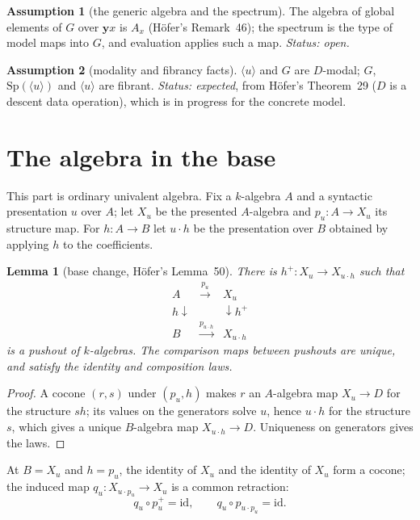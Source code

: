 \documentclass[11pt]{amsart}
\newtheorem{lemma}[theorem]{Lemma}
\theoremstyle{definition}
\newtheorem{assumption}{Assumption}
\theoremstyle{remark}
\newcommand{\Sp}{\mathrm{Sp}}
\newcommand{\yo}{\mathbf{y}}
\newcommand{\pres}[1]{\langle #1\rangle}
\begin{document}
\begin{assumption}[the generic algebra and the spectrum]\label{a:G}
The algebra of global elements of $G$ over $\yo x$ is $A_x$ (H\"ofer's
Remark~46); the spectrum is the type of model maps into $G$, and
evaluation applies such a map.
\emph{Status: open.}
\end{assumption}

\begin{assumption}[modality and fibrancy facts]\label{a:mods}
$\pres u$ and $G$ are $D$-modal; $G$, $\Sp(\pres u)$ and $\pres u$ are
fibrant.
\emph{Status: expected}, from H\"ofer's Theorem~29 ($D$ is a descent data
operation), which is in progress for the concrete model.
\end{assumption}

\section{The algebra in the base}\label{sec:algebra}

This part is ordinary univalent algebra. Fix a $k$-algebra $A$ and a
syntactic presentation $u$ over $A$; let $X_u$ be the presented
$A$-algebra and $p_u\colon A\to X_u$ its structure map. For $h\colon A\to
B$ let $u\cdot h$ be the presentation over $B$ obtained by applying $h$ to
the coefficients.

\begin{lemma}[base change, H\"ofer's Lemma~50]\label{lem:bc}
There is $h^+\colon X_u\to X_{u\cdot h}$ such that
\[
\begin{array}{ccc}
A & \xrightarrow{p_u} & X_u\\
{\scriptstyle h}\downarrow && \downarrow{\scriptstyle h^+}\\
B & \xrightarrow{p_{u\cdot h}} & X_{u\cdot h}
\end{array}
\]
is a pushout of $k$-algebras. The comparison maps between pushouts are
unique, and satisfy the identity and composition laws.
\end{lemma}

\begin{proof}
A cocone $(r,s)$ under $(p_u,h)$ makes $r$ an $A$-algebra map $X_u\to D$
for the structure $s h$; its values on the generators solve $u$, hence
$u\cdot h$ for the structure $s$, which gives a unique $B$-algebra map
$X_{u\cdot h}\to D$. Uniqueness on generators gives the laws.
\end{proof}

At $B=X_u$ and $h=p_u$, the identity of $X_u$ and the identity of $X_u$
form a cocone; the induced map $q_u\colon X_{u\cdot p_u}\to X_u$ is a common
retraction:
\begin{equation}\label{eq:q}
q_u\circ p_u^+ = \mathrm{id}, \qquad q_u\circ p_{u\cdot p_u} = \mathrm{id}.
\end{equation}
\end{document}
